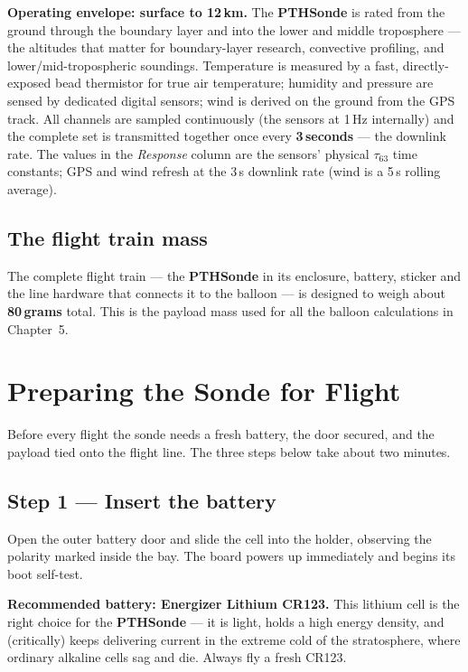 \documentclass[11pt,openany]{report}
\newcommand{\PTH}{\texorpdfstring{\textbf{PTH}\textcolor{tlorange}{\textbf{Sonde}}}{PTHSonde}}
\begin{document}
\begin{note}
\textbf{Operating envelope: surface to 12\,km.} The \PTH{} is rated from the ground
through the boundary layer and into the lower and middle troposphere --- the altitudes
that matter for boundary-layer research, convective profiling, and lower/mid-tropospheric
soundings. Temperature is measured by a fast, directly-exposed bead thermistor for true
air temperature; humidity and pressure are sensed by dedicated digital sensors; wind is
derived on the ground from the GPS track. All channels are sampled continuously (the
sensors at 1\,Hz internally) and the complete set is transmitted together once every
\textbf{3\,seconds} --- the downlink rate. The values in the \emph{Response} column are
the sensors' physical $\tau_{63}$ time constants; GPS and wind refresh at the 3\,s
downlink rate (wind is a 5\,s rolling average).
\end{note}

\section{The flight train mass}
The complete flight train --- the \PTH{} in its enclosure, battery, sticker and the
line hardware that connects it to the balloon --- is designed to weigh about
\textbf{80\,grams} total. This is the payload mass used for all the balloon
calculations in Chapter~5.

\chapter{Preparing the Sonde for Flight}

Before every flight the sonde needs a fresh battery, the door secured, and the
payload tied onto the flight line. The three steps below take about two minutes.

\section{Step 1 --- Insert the battery}
Open the outer battery door and slide the cell into the holder, observing the
polarity marked inside the bay. The board powers up immediately and begins its
boot self-test.

\begin{note}
\textbf{Recommended battery: Energizer Lithium CR123.} This lithium cell is the
right choice for the \PTH{} --- it is light, holds a high energy density, and
(critically) keeps delivering current in the extreme cold of the stratosphere,
where ordinary alkaline cells sag and die. Always fly a fresh CR123.
\end{note}
\end{document}
